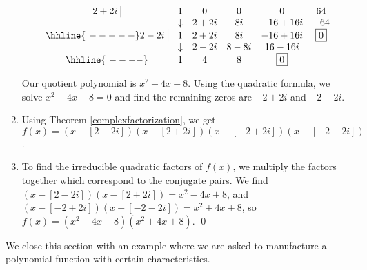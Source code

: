 \documentclass{ximera}
\begin{document}
\begin{ex}
\begin{enumerate}
\[ \begin{array}{cccccc}
  2+2i \, \, \vline& 1 & 0 & 0  & 0 & 64 \\

  & \downarrow     &  2+2i  &  8i & -16+16i & -64\\ \hhline{~-----} 
  
  2-2i \, \, \vline  & 1 &  2+2i  & 8i & -16+16i &  \fbox{$0$}  \\
    
               & \downarrow &  2-2i  &  8-8i  & 16-16i &\\ \hhline{~----} 
 
                & 1  &  4  & 8& \fbox{0} &   \\
  


\end{array}\]

Our quotient polynomial is $x^2+4x+8$.  Using the quadratic formula, we solve $x^2+4x+8 = 0$ and find the remaining zeros are $-2+2i$ and $-2-2i$.  

\item  Using Theorem \ref{complexfactorization}, we get $f(x) = (x-[2-2i])(x-[2+2i])(x-[-2+2i])(x-[-2-2i])$.

\item  To find the irreducible quadratic factors of $f(x)$, we multiply the factors together which correspond to the conjugate pairs.  We find $(x-[2-2i])(x-[2+2i]) = x^2-4x+8$, and $(x-[-2+2i])(x-[-2-2i]) = x^2+4x+8$, so  $f(x) =  \left(x^2-4x+8\right) \left(x^2+4x+8\right)$. \qed

\end{enumerate}

\end{ex}


We close this section with an example where we are asked to manufacture a polynomial function with certain characteristics.
\end{document}
